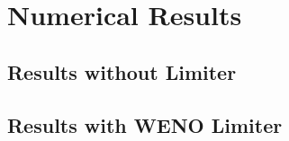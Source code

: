 \section{Numerical Results}

\subsection{Results without Limiter}


\subsection{Results with WENO Limiter}